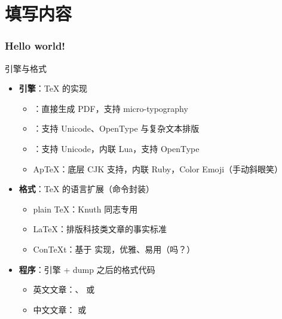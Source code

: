 \section{填写内容}

\begin{frame}[fragile]
\frametitle{Hello world!}
\pause
{}
\end{frame}

\begin{frame}{引擎与格式}
\begin{itemize}
  \item<+-> \textbf{引擎}：\TeX{} 的实现
    \begin{itemize}
      \item \pdfTeX{}：直接生成 PDF，支持 micro-typography
      \item \XeTeX{}：支持 Unicode、OpenType 与复杂文本排版
      \item \LuaTeX{}：支持 Unicode，内联 Lua，支持 OpenType
      \item Ap\TeX{}：底层 CJK 支持，内联 Ruby，Color Emoji（手动斜眼笑）
    \end{itemize}
  \item<+-> \textbf{格式}：\TeX{} 的语言扩展（命令封装）
    \begin{itemize}
      \item plain \TeX{}：Knuth 同志专用
      \item \LaTeX{}：排版科技类文章的事实标准
      \item Con\TeX t：基于 \LuaTeX{} 实现，优雅、易用（吗？）
    \end{itemize}
  \item<+-> \textbf{程序}：引擎 + dump 之后的格式代码
    \begin{itemize}
      \item \alert{英文文章：\pdfLaTeX{}、\XeLaTeX{} 或 \LuaLaTeX{}}
      \item \alert{中文文章：\XeLaTeX{} 或 \LuaLaTeX{}}
    \end{itemize}
\end{itemize}
\end{frame}

